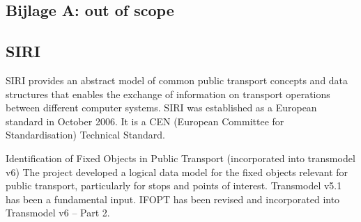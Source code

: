 \begin{appendices}

\newpage
\section*{Bijlage A: out of scope}
\subsection*{SIRI}
SIRI provides an abstract model of common public transport concepts and data structures that enables the exchange of information on transport operations between different computer systems. SIRI was established as a European standard in October 2006. It is a CEN (European Committee for Standardisation) Technical Standard.

 Identification of Fixed Objects in Public Transport (incorporated into transmodel v6)
The project developed a logical data model for the fixed objects relevant for public transport, particularly for stops and points of interest. Transmodel v5.1 has been a fundamental input. IFOPT has been revised and incorporated into Transmodel v6 – Part 2.

\end{appendices}